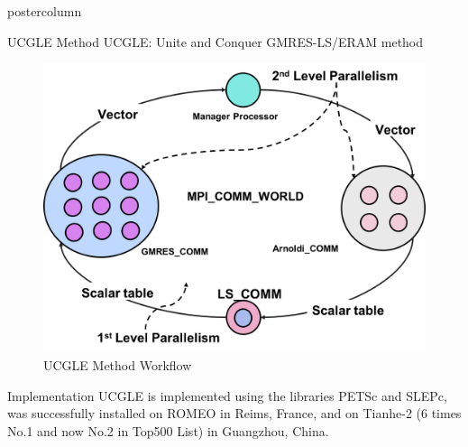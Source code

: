 \documentclass{beamer}
\begin{document}
\begin{frame}
\begin{columns}
\begin{column}{.33\textwidth}
\begin{beamercolorbox}[center]{postercolumn}
\begin{minipage}{.98\textwidth}
{					\begin{myblock}{UCGLE Method}
						UCGLE: Unite and Conquer \cite{emad2016unite} GMRES-LS/ERAM method
						\vspace{0.6em}
						\begin{figure}
							\begin{minipage}{.5\textwidth}
								\centering\includegraphics[width=\textwidth]{img/glsa_mpi.png}
								\caption{UCGLE Method Workflow}
							\end{minipage}
						\end{figure}
					\end{myblock}


					\begin{myblock}{Implementation}
				UCGLE is implemented using the libraries PETSc and SLEPc, was successfully installed on ROMEO in Reims, France, and on Tianhe-2 (6 times No.1 and now No.2 in Top500 List) in Guangzhou, China.
\vspace{0.5em}


\end{myblock}}
\end{minipage}
\end{beamercolorbox}
\end{column}
\end{columns}
\end{frame}
\end{document}
